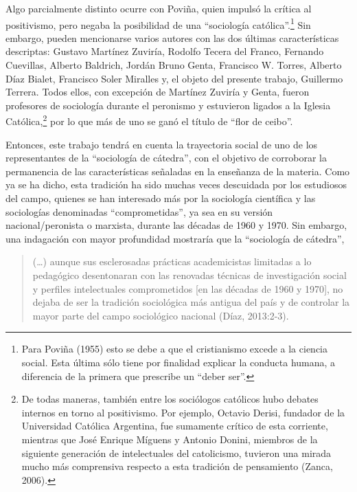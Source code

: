 Algo parcialmente distinto ocurre con Poviña, quien impulsó la crítica al positivismo, pero negaba la posibilidad de una ``sociología católica''.\footnote{Para Poviña (1955) esto se debe a que el cristianismo excede a la ciencia social. Esta última sólo tiene por finalidad explicar la conducta humana, a diferencia de la primera que prescribe un ``deber ser''.} Sin embargo, pueden mencionarse varios autores con las dos últimas características descriptas: Gustavo Martínez Zuviría, Rodolfo Tecera del Franco, Fernando Cuevillas, Alberto Baldrich, Jordán Bruno Genta, Francisco W. Torres, Alberto Díaz Bialet, Francisco Soler Miralles y, el objeto del presente trabajo, Guillermo Terrera. Todos ellos, con excepción de Martínez Zuviría y Genta, fueron profesores de sociología durante el peronismo y estuvieron ligados a la Iglesia Católica,\footnote{De todas maneras, también entre los sociólogos católicos hubo debates internos en torno al positivismo. Por ejemplo, Octavio Derisi, fundador de la Universidad Católica Argentina, fue sumamente crítico de esta corriente, mientras que José Enrique Míguens y Antonio Donini, miembros de la siguiente generación de intelectuales del catolicismo, tuvieron una mirada mucho más comprensiva respecto a esta tradición de pensamiento (Zanca, 2006).} por lo que más de uno se ganó el título de ``flor de ceibo''.

Entonces, este trabajo tendrá en cuenta la trayectoria social de uno de los representantes de la ``sociología de cátedra'', con el objetivo de corroborar la permanencia de las características señaladas en la enseñanza de la materia. Como ya se ha dicho, esta tradición ha sido muchas veces descuidada por los estudiosos del campo, quienes se han interesado más por la sociología científica y las sociologías denominadas ``comprometidas'', ya sea en su versión nacional/peronista o marxista, durante las décadas de 1960 y 1970. Sin embargo, una indagación con mayor profundidad mostraría que la ``sociología de cátedra'',

\begin{quote}
(\ldots) aunque sus esclerosadas prácticas academicistas limitadas a lo pedagógico desentonaran con las renovadas técnicas de investigación social y perfiles intelectuales comprometidos {[}en las décadas de 1960 y 1970{]}, no dejaba de ser la tradición sociológica más antigua del país y de controlar la mayor parte del campo sociológico nacional (Díaz, 2013:2-3).
\end{quote}

